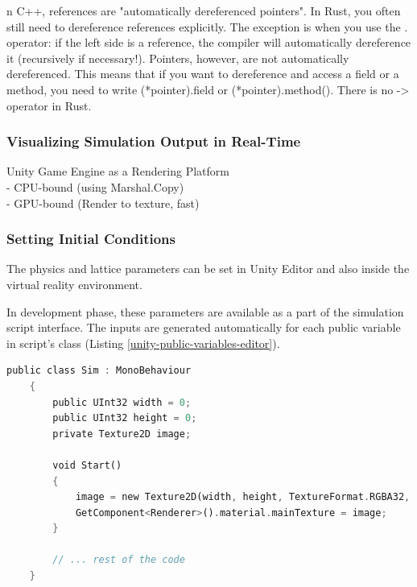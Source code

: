 n C++, references are "automatically dereferenced pointers". In Rust, you often still need to dereference references explicitly. The exception is when you use the . operator: if the left side is a reference, the compiler will automatically dereference it (recursively if necessary!). Pointers, however, are not automatically dereferenced. This means that if you want to dereference and access a field or a method, you need to write (*pointer).field or (*pointer).method(). There is no -> operator in Rust.



\subsubsection{Visualizing Simulation Output in Real-Time}

Unity Game Engine as a Rendering Platform \\

- CPU-bound (using Marshal.Copy) \\
- GPU-bound (Render to texture, fast) \\

\subsubsection{Setting Initial Conditions}

The physics and lattice parameters can be set in Unity Editor and also inside the virtual reality environment.

In development phase, these parameters are available as a part of the simulation script interface. The inputs are generated automatically for each public variable in script's class (Listing \ref{unity-public-variables-editor}).

\begin{lstlisting}[language=Rust, caption=Boundary conditions at solid nodes., label=unity-public-variables-editor]
	public class Sim : MonoBehaviour
	{
		public UInt32 width = 0;
		public UInt32 height = 0;
		private Texture2D image;
		
		void Start()
		{
			image = new Texture2D(width, height, TextureFormat.RGBA32, false);
			GetComponent<Renderer>().material.mainTexture = image;
		}
		
		// ... rest of the code
	}
\end{lstlisting}

